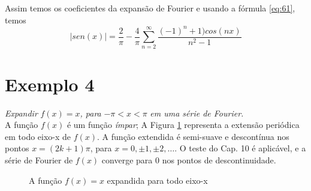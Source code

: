 Assim temos os coeficientes da expansão de Fourier e usando a fórmula \ref{eq:61}, temos
\begin{equation}
    |sen(x)| = \dfrac{2}{\pi} - \dfrac{4}{\pi}\sum\limits_{n=2}^{\infty}\dfrac{(-1)^n + 1)cos(nx)}{n^2 - 1}
\end{equation}

\section*{Exemplo 4}
\textit{Expandir }$f(x) = x$\textit{, para }$ -\pi < x < \pi$\textit{ em uma série de Fourier.}\\

A função $f(x)$ é um função \textit{ímpar}; A Figura \ref{fig:exemplo4} representa a extensão 
periódica em todo eixo-x de $f(x)$. A função extendida é semi-suave e descontínua nos pontos 
$x = (2k + 1)\pi$, para $x = 0, \pm 1, \pm 2,\ldots$. O teste do Cap. 10 é aplicável, e a série 
de Fourier de $f(x)$ converge para 0 nos pontos de descontinuidade.

\begin{figure}[H]

    \caption{A função $f(x) = x$ expandida para todo eixo-x}
    \label{fig:exemplo4}
\end{figure}


